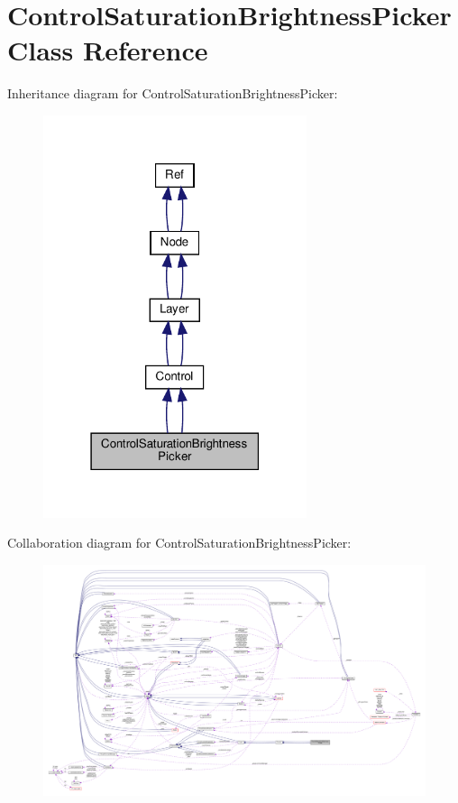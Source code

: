 \hypertarget{classControlSaturationBrightnessPicker}{}\section{Control\+Saturation\+Brightness\+Picker Class Reference}
\label{classControlSaturationBrightnessPicker}


Inheritance diagram for Control\+Saturation\+Brightness\+Picker\+:
\nopagebreak
\begin{figure}[H]
\begin{center}
\leavevmode
\includegraphics[width=219pt]{classControlSaturationBrightnessPicker__inherit__graph}
\end{center}
\end{figure}


Collaboration diagram for Control\+Saturation\+Brightness\+Picker\+:
\nopagebreak
\begin{figure}[H]
\begin{center}
\leavevmode
\includegraphics[width=350pt]{classControlSaturationBrightnessPicker__coll__graph}
\end{center}
\end{figure}

